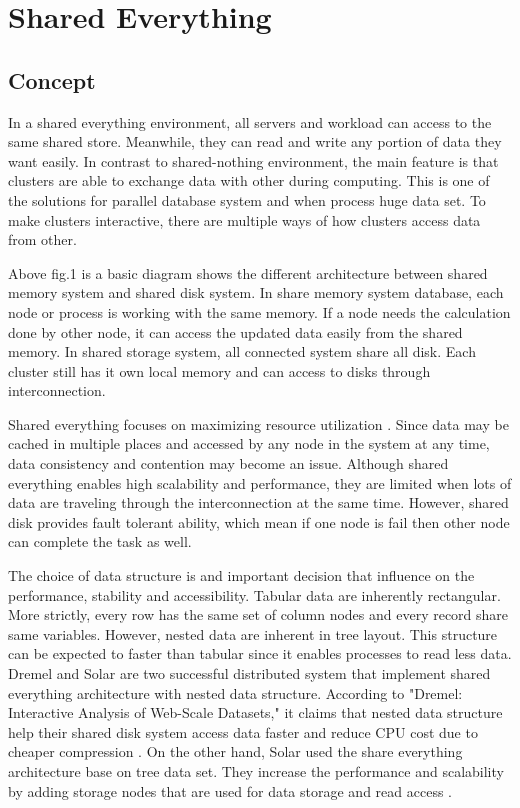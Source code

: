 \documentclass[onecolumn, draftclsnofoot,10pt, compsoc]{IEEEtran}
\begin{document}
	\newpage
	\tableofcontents
	\clearpage
	
	\section{Shared Everything}

    \subsection{Concept}
In a shared everything environment, all servers and workload can access to the same shared store.
Meanwhile, they can read and write any portion of data they want easily.
In contrast to shared-nothing environment, the main feature is that clusters are able to exchange data with other during computing.
This is one of the solutions for parallel database system and when process huge data set. 
To make clusters interactive, there are multiple ways of how clusters access data from other.


Above fig.1 is a basic diagram shows the different architecture between shared memory system and shared disk system. 
In share memory system database, each node or process is working with the same memory. 
If a node needs the calculation done by other node, it can access the updated data easily from the shared memory. 
In shared storage system, all connected system share all disk. 
Each cluster still has it own local memory and can access to disks through interconnection.

Shared everything focuses on maximizing resource utilization \cite{ClaussenBestofBoth}. 
Since data may be cached in multiple places and accessed by any node in the system at any time, data consistency and contention may become an issue.
Although shared everything enables high scalability and performance, they are limited when lots of data are traveling through the interconnection at the same time. 
However, shared disk provides fault tolerant ability, which mean if one node is fail then other node can complete the task as well.  

The choice of data structure is and important decision that influence on the performance, stability and accessibility.
Tabular data are inherently rectangular.
More strictly, every row has the same set of column nodes and every record share same variables.
However, nested data are inherent in tree layout.
This structure can be expected to faster than tabular since it enables processes to read less data.
Dremel and Solar are two successful distributed system that implement shared everything architecture with nested data structure.
According to "Dremel: Interactive Analysis of Web-Scale Datasets," it claims that nested data structure help their shared disk system access data faster and reduce CPU cost due to cheaper compression \cite{Dremel}.
On the other hand, Solar used the share everything architecture base on tree data set.
They increase the performance and scalability by adding storage nodes that are used for data storage and read access \cite{zhu2018solar}.  
\end{document}
